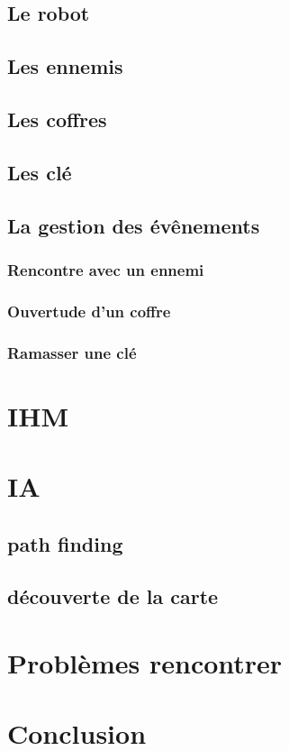 \documentclass[a4paper 12pts]{article}
\begin{document}


\subsection{Le robot}
\subsection{Les ennemis}
\subsection{Les coffres}
\subsection{Les clé}
\subsection{La gestion des évênements}
\subsubsection {Rencontre avec un ennemi} 
\subsubsection {Ouvertude d'un coffre}
\subsubsection {Ramasser une clé}

\section{IHM}



\section{IA}


\subsection{path finding}
\subsection{découverte de la carte}



\section{Problèmes rencontrer}

\section{Conclusion}
\end{document}
